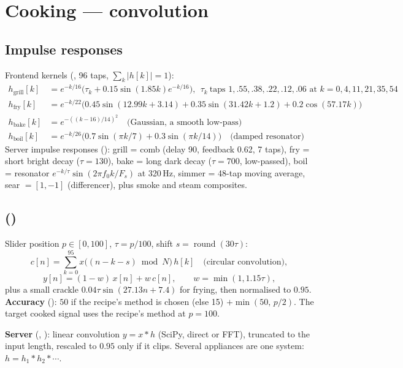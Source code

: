 \documentclass[11pt,a4paper]{article}
\begin{document}
\section{Cooking --- convolution}
\subsection{Impulse responses}
Frontend kernels (, 96 taps, $\sum_k|h[k]|=1$):
\begin{align*}
h_{\text{grill}}[k]&=e^{-k/16}\bigl(\tau_k+0.15\sin(1.85k)e^{-k/16}\bigr),\ \ \tau_k\ \text{taps }1,.55,.38,.22,.12,.06\text{ at }k=0,4,11,21,35,54\\
h_{\text{fry}}[k]&=e^{-k/22}\bigl(0.45\sin(12.99k+3.14)+0.35\sin(31.42k+1.2)+0.2\cos(57.17k)\bigr)\\
h_{\text{bake}}[k]&=e^{-((k-16)/14)^2}\quad\text{(Gaussian, a smooth low-pass)}\\
h_{\text{boil}}[k]&=e^{-k/26}\bigl(0.7\sin(\pi k/7)+0.3\sin(\pi k/14)\bigr)\quad\text{(damped resonator)}
\end{align*}
Server impulse responses (): grill = comb (delay 90, feedback
0.62, 7 taps), fry = short bright decay ($\tau=130$), bake = long dark decay ($\tau=700$,
low-passed), boil = resonator $e^{-k/\tau}\sin(2\pi f_0k/F_s)$ at 320\,Hz, simmer = 48-tap moving
average, sear $=[1,-1]$ (differencer), plus smoke and steam composites.

\subsection{ ()}
Slider position $p\in[0,100]$, $\tau=p/100$, shift $s=\operatorname{round}(30\tau)$:
\[
c[n]=\sum_{k=0}^{95}x\bigl((n-k-s)\bmod N\bigr)\,h[k]\quad\text{(circular convolution)},
\]
\[
y[n]=(1-w)\,x[n]+w\,c[n],\qquad w=\min(1,1.15\tau),
\]
plus a small crackle $0.04\tau\sin(27.13n+7.4)$ for frying, then normalised to $0.95$.
\textbf{Accuracy} (): $50$ if the recipe's method is chosen (else 15)
$+\min(50,\,p/2)$. The target cooked signal uses the recipe's method at $p=100$.

\textbf{Server} (, ): linear convolution $y=x*h$ (SciPy,
direct or FFT), truncated to the input length, rescaled to $0.95$ only if it clips.
Several appliances are one system:  $h=h_1*h_2*\cdots$.
\end{document}
